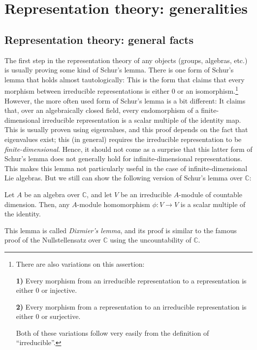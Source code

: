 \documentclass[etingof-lie.tex]{subfiles}
\begin{document}
\section{Representation theory: generalities}
\subsection{Representation theory: general facts}

The first step in the representation theory of any objects (groups, algebras,
etc.) is usually proving some kind of Schur's lemma. There is one form of
Schur's lemma that holds almost tautologically: This is the form that claims
that every morphism between irreducible representations is either $0$ or an
isomorphism.\footnote{There are also variations on this assertion:
\par
\textbf{1)} Every morphism from an irreducible representation to a
representation is either $0$ or injective.
\par
\textbf{2)} Every morphism from a representation to an irreducible
representation is either $0$ or surjective.
\par
Both of these variations follow very easily from the definition of
``irreducible''.} However, the more often used form of Schur's lemma is a bit
different: It claims that, over an algebraically closed field, every
endomorphism of a finite-dimensional irreducible representation is a scalar
multiple of the identity map. This is usually proven using eigenvalues, and
this proof depends on the fact that eigenvalues exist; this (in general)
requires the irreducible representation to be \textit{finite-dimensional}.
Hence, it should not come as a surprise that this latter form of Schur's lemma
does not generally hold for infinite-dimensional representations. This makes
this lemma not particularly useful in the case of infinite-dimensional Lie
algebras. But we still can show the following version of Schur's lemma over
$\mathbb{C}$:

\begin{lemma}
\label{lem.dix}Let $A$ be an algebra over $\mathbb{C}$, and
let $V$ be an irreducible $A$-module of countable dimension. Then, any
$A$-module homomorphism $\phi:V\rightarrow V$ is a scalar multiple of the identity.
\end{lemma}

This lemma is called \textit{Dixmier's lemma}, and its proof is similar to the
famous proof of the Nullstellensatz over $\mathbb{C}$ using the uncountability
of $\mathbb{C}$.
\end{document}
